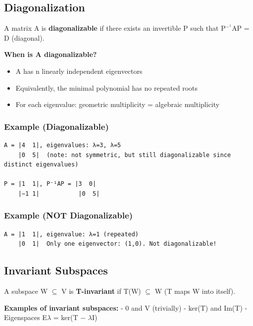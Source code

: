 \documentclass[12pt,a4paper,openany]{book}
\begin{document}
{{\subsection{Diagonalization }

A matrix A is \textbf{diagonalizable} if there exists an invertible P such that P$^{-}^1$AP = D (diagonal).

\textbf{When is A diagonalizable?}
\begin{itemize}[leftmargin=*]
  \item A has n linearly independent eigenvectors
  \item Equivalently, the minimal polynomial has no repeated roots
  \item For each eigenvalue: geometric multiplicity = algebraic multiplicity
\end{itemize}

\subsubsection{Example (Diagonalizable)}
\begin{verbatim}
A = |4  1|, eigenvalues: λ=3, λ=5
    |0  5|  (note: not symmetric, but still diagonalizable since distinct eigenvalues)

P = |1  1|, P⁻¹AP = |3  0|
    |−1 1|           |0  5|
\end{verbatim}

\subsubsection{Example (NOT Diagonalizable)}
\begin{verbatim}
A = |1  1|, eigenvalue: λ=1 (repeated)
    |0  1|  Only one eigenvector: (1,0). Not diagonalizable!
\end{verbatim}

\subsection{Invariant Subspaces}

A subspace W $\subseteq$ V is \textbf{T-invariant} if T(W) $\subseteq$ W (T maps W into itself).

\begin{tcolorbox}[colback=examplebg!30,colframe=exampleborder,title=\textbf{Worked Example},breakable,boxrule=1pt]
\textbf{Examples of invariant subspaces:}
- {0} and V (trivially)
- ker(T) and Im(T)
- Eigenspaces E$\lambda$ = ker(T − $\lambda$I)
\end{tcolorbox}

}}
\end{document}
